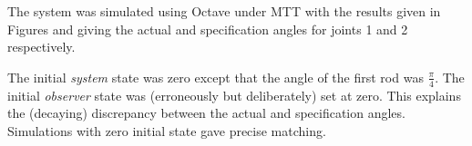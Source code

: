 The system was simulated using Octave under MTT with the results given
in Figures
and
giving the actual and specification angles for joints 1 and 2
respectively.

The initial \emph{system} state was zero except that the angle of the
first rod was $\frac{\pi}{4}$. The initial \emph{observer} state was
(erroneously but deliberately) set at zero. This explains the
(decaying) discrepancy between the actual and specification angles.
Simulations with zero initial state gave precise matching.

